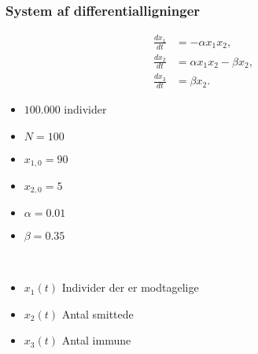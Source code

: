 \begin{frame}
\frametitle{System af differentialligninger}
\begin{minipage}[t]{0.50\textwidth}
\begin{align}
\frac{dx_1}{dt} & = - \alpha x_1 x_2, \\
\frac{dx_2}{dt} & = \alpha x_1 x_2 - \beta x_2 , \\
\frac{dx_3}{dt} & = \beta x_2.
\end{align}
\end{minipage}
\begin{minipage}[t]{0.45\textwidth}
\begin{itemize}
\item $100.000$ individer 
\item $N = 100$ 
\item $x_{1,0} = 90$ 
\item $x_{2,0} = 5 $
\item $\alpha = 0.01$ 
\item $\beta = 0.35$
\end{itemize}
\phantom{H}
\end{minipage}
\\
\begin{itemize}
\item $x_1(t)$ Individer der er modtagelige 
\item $x_2(t)$ Antal smittede 
\item $x_3(t)$ Antal immune 
\end{itemize}
\end{frame}
